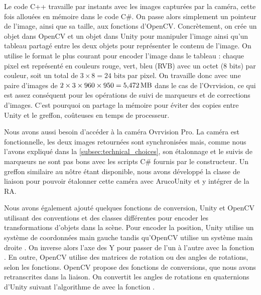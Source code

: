Le code C++ travaille par instants avec les images capturées par la caméra, cette fois allouées en mémoire dans le code C\#. On passe alors simplement un pointeur de l'image, ainsi que sa taille, aux fonctions d'OpenCV. Concrètement, on crée un objet  dans OpenCV et un objet  dans Unity pour manipuler l'image ainsi qu'un tableau partagé entre les deux objets pour représenter le contenu de l'image. On utilise le format le plus courant pour encoder l'image dans le tableau : chaque pixel est représenté en couleurs rouge, vert, bleu (RVB) avec un octet (8 bits) par couleur, soit un total de $3 \times 8 = 24\text{ bits}$ par pixel. On travaille donc avec une paire d'images de $2 \times 3 \times 960 \times 950 = \SI{5.472}{\mega\byte}$ dans le cas de l'Ovrvision, ce qui est assez conséquent pour les opérations de suivi de marqueurs et de corrections d'images. C'est pourquoi on partage la mémoire pour éviter des copies entre Unity et le greffon, coûteuses en temps de processeur.

Nous avons aussi besoin d'accéder à la caméra Ovrvision Pro. La caméra est fonctionnelle, les deux images retournées sont synchronisées mais, comme nous l'avons expliqué dans la \autoref{subsec:technical_choices}, son étalonnage et le suivis de marqueurs ne sont pas bons avec les scripts C\# fournis par le constructeur. Un greffon similaire au nôtre étant disponible, nous avons développé la classe  de liaison  pour pouvoir étalonner cette caméra avec ArucoUnity et y intégrer de la RA.


Nous avons également ajouté quelques fonctions de conversion, Unity et OpenCV utilisant des conventions et des classes différentes pour encoder les transformations d'objets dans la scène. Pour encoder la position, Unity utilise un système de coordonnées main gauche  tandis qu'OpenCV utilise un système main droite . On inverse alors l'axe des Y pour passer de l'un à l'autre avec la fonction . En outre, OpenCV utilise des matrices de rotation ou des angles de rotations, selon les fonctions. OpenCV propose des fonctions de conversions, que nous avons retranscrites dans la liaison. On convertit les angles de rotations en quaternions d'Unity suivant l'algorithme de \cite{Baker1998} avec la fonction .

